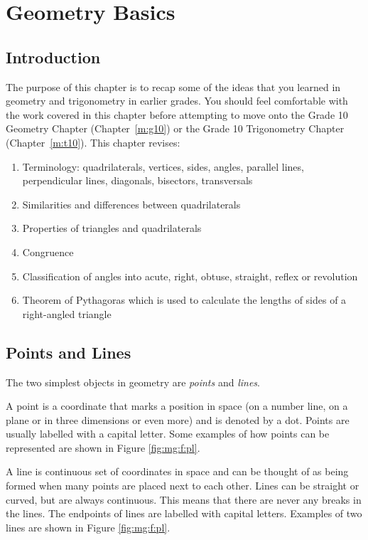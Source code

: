 \documentclass[10pt,a4paper,titlepage,twoside,openright]{report}
\begin{document}
\chapter{Geometry Basics}
\label{m:gt:basics}

\section{Introduction}
\label{mgt:intro}

The purpose of this chapter is to recap some of the ideas that you learned in geometry and trigonometry in earlier grades. You should feel comfortable with the work covered in this chapter before attempting to move onto the Grade 10 Geometry Chapter (Chapter~\ref{m:g10}) or the Grade 10 Trigonometry Chapter (Chapter~\ref{m:t10}). This chapter revises:

\begin{enumerate}
\raggedright
\item Terminology: quadrilaterals, vertices, sides, angles, parallel lines, perpendicular lines, diagonals, bisectors, transversals
\item Similarities and differences between quadrilaterals
\item Properties of triangles and quadrilaterals
\item Congruence
\item Classification of angles into acute, right, obtuse, straight, reflex or revolution
\item Theorem of Pythagoras which is used to calculate the lengths of sides of a right-angled triangle
\end{enumerate}

\section{Points and Lines}
\label{mgt:pl}

The two simplest objects in geometry are \textit{points} and \textit{lines}. 

A point is a coordinate that marks a position in space (on a number line, on a plane or in three dimensions or even more) and is denoted by a dot. Points are usually labelled with a capital letter. Some examples of how points can be represented are shown in Figure \ref{fig:mg:f:pl}.

A line is continuous set of coordinates in space and can be thought of as being formed when many points are placed next to each other. Lines can be straight or curved, but are always continuous. This means that there are never any breaks in the lines. The endpoints of lines are labelled with capital letters. Examples of two lines are shown in Figure \ref{fig:mg:f:pl}. \\
\end{document}
